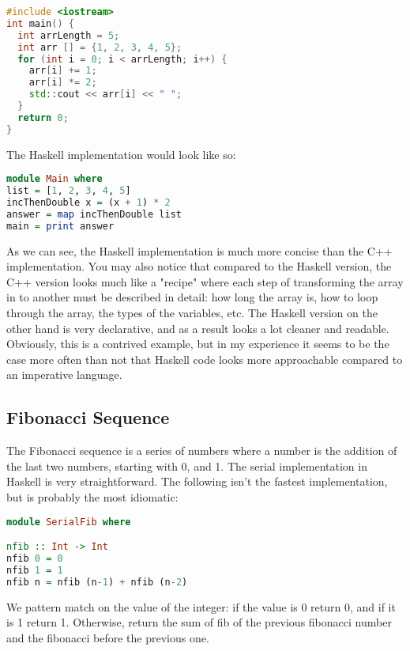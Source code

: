 \documentclass[a4paper, 10pt]{article}
\begin{document}
\begin{lstlisting}[language=C++, caption=C++ example]
#include <iostream>
int main() {
  int arrLength = 5;
  int arr [] = {1, 2, 3, 4, 5};
  for (int i = 0; i < arrLength; i++) {
    arr[i] += 1;
    arr[i] *= 2;
    std::cout << arr[i] << " ";
  }
  return 0;
}
\end{lstlisting}

The Haskell implementation would look like so:

\begin{lstlisting}[language=Haskell, caption=Haskell example]
module Main where
list = [1, 2, 3, 4, 5]
incThenDouble x = (x + 1) * 2
answer = map incThenDouble list
main = print answer
\end{lstlisting}

As we can see, the Haskell implementation is much more concise than the C++ implementation. You may also notice that compared to the Haskell version, the C++ version looks much like a "recipe" where each step of transforming the array in to another must be described in detail: how long the array is, how to loop through the array, the types of the variables, etc. The Haskell version on the other hand is very declarative, and as a result looks a lot cleaner and readable. Obviously, this is a contrived example, but in my experience it seems to be the case more often than not that Haskell code looks more approachable compared to an imperative language.

\subsection{Fibonacci Sequence}
The Fibonacci sequence is a series of numbers where a number is the addition of the last two numbers, starting with 0, and 1. The serial implementation in Haskell is very straightforward. The following isn't the fastest implementation, but is probably the most idiomatic:

\begin{lstlisting}[language=Haskell, caption=Haskell Fibonacci]
module SerialFib where

nfib :: Int -> Int
nfib 0 = 0
nfib 1 = 1
nfib n = nfib (n-1) + nfib (n-2)
\end{lstlisting}

We pattern match on the value of the integer: if the value is 0 return 0, and if it is 1 return 1. Otherwise, return the sum of fib of the previous fibonacci number and the fibonacci before the previous one. 
\end{document}
